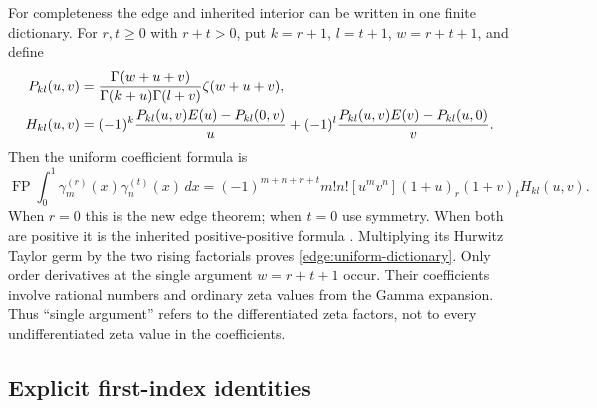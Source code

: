 \documentclass[11pt,letterpaper]{article}
\numberwithin{equation}{section}
\theoremstyle{definition}
\theoremstyle{remark}
\begin{document}
For completeness the edge and inherited interior can be written in one
finite dictionary. For $r,t\ge0$ with $r+t>0$, put
$k=r+1$, $l=t+1$, $w=r+t+1$, and define
\begin{align}
 P_{kl}(u,v)&=\frac{\Gamma(w+u+v)}{\Gamma(k+u)\Gamma(l+v)}
                         \zeta(w+u+v),\notag\\
 H_{kl}(u,v)&=(-1)^k\frac{P_{kl}(u,v)E(u)-P_{kl}(0,v)}{u}
       +(-1)^l\frac{P_{kl}(u,v)E(v)-P_{kl}(u,0)}{v}.
       \label{edge:uniform-kernel}
\end{align}
Then the uniform coefficient formula is
\begin{equation}\label{edge:uniform-dictionary}
 \boxed{\displaystyle
 \operatorname{FP}\int_0^1\gamma_m^{(r)}(x)\gamma_n^{(t)}(x)\,dx
 =(-1)^{m+n+r+t}m!n![u^mv^n]
             (1+u)_r(1+v)_tH_{kl}(u,v).}
\end{equation}
When $r=0$ this is the new edge theorem; when $t=0$ use symmetry.
When both are positive it is the inherited positive-positive formula
\cite[Theorem \texttt{hprod:stieltjes-products}]{tail-polygamma}.
Multiplying its Hurwitz Taylor germ by the two rising factorials
proves \eqref{edge:uniform-dictionary}. Only order derivatives at the
single argument $w=r+t+1$ occur. Their coefficients involve rational
numbers and ordinary zeta values from the Gamma expansion. Thus
``single argument'' refers to the differentiated zeta factors, not
to every undifferentiated zeta value in the coefficients.

\subsection{Explicit first-index identities}
\end{document}
